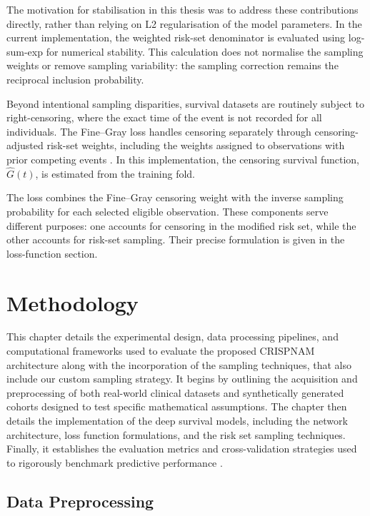 \documentclass[a4paper,twoside,12pt]{report}
\begin{document}
The motivation for stabilisation in this thesis was to address these contributions directly, rather than relying on L2 regularisation of the model parameters. In the current implementation, the weighted risk-set denominator is evaluated using log-sum-exp for numerical stability. This calculation does not normalise the sampling weights or remove sampling variability: the sampling correction remains the reciprocal inclusion probability.

Beyond intentional sampling disparities, survival datasets are routinely subject to right-censoring, where the exact time of the event is not recorded for all individuals. The Fine--Gray loss handles censoring separately through censoring-adjusted risk-set weights, including the weights assigned to observations with prior competing events \citep{FineGray1999}. In this implementation, the censoring survival function, $\hat G(t)$, is estimated from the training fold.

The loss combines the Fine--Gray censoring weight with the inverse sampling probability for each selected eligible observation. These components serve different purposes: one accounts for censoring in the modified risk set, while the other accounts for risk-set sampling. Their precise formulation is given in the loss-function section.



\chapter{Methodology}
\label{ch:methodology}

This chapter details the experimental design, data processing pipelines, and computational frameworks used to evaluate the proposed CRISPNAM architecture along with the  incorporation of the sampling techniques, that also include our custom sampling strategy. It begins by outlining the acquisition and preprocessing of both real-world clinical datasets and synthetically generated cohorts designed to test specific mathematical assumptions. The chapter then details the implementation of the deep survival models, including the network architecture, loss function formulations, and the risk set sampling techniques. Finally, it establishes the evaluation metrics and cross-validation strategies used to rigorously benchmark predictive performance .

\section{Data Preprocessing}
\end{document}
